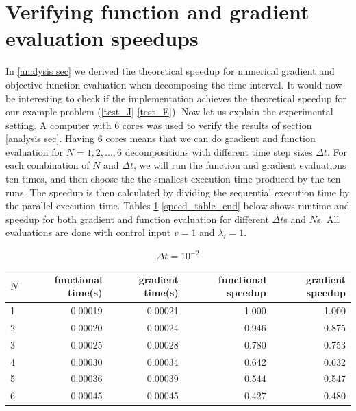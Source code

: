 \section{Verifying function and gradient evaluation speedups} \label{ver S sec}
In \ref{analysis sec} we derived the theoretical speedup for numerical gradient and objective function evaluation when decomposing the time-interval. It would now be interesting to check if the implementation achieves the theoretical speedup for our example problem (\ref{test_J}-\ref{test_E}). Now let us explain the experimental setting. A computer with 6 cores was used to verify the results of section \ref{analysis sec}. Having 6 cores means that we can do gradient and function evaluation for $N=1,2,...,6$ decompositions with different time step sizes $\Delta t$. For each combination of $N$ and $\Delta t$, we will run the function and gradient evaluations ten times, and then choose the the smallest execution time produced by the ten runs. The speedup is then calculated by dividing the sequential execution time by the parallel execution time. Tables \ref{Speed_table1}-\ref{speed_table_end} below shows runtime and speedup for both gradient and function evaluation for different $\Delta t$s and $N$s. All evaluations are done with control input $v=1$ and $\lambda_i=1$.  
\\
\begin{table}[!h]
\centering
\caption{$\Delta t=10^{-2}$}
\label{Speed_table1}
\begin{tabular}{lrrrr}
\toprule
{}$N$ &  functional time(s) &  gradient time(s) &  functional speedup &  gradient speedup \\
\midrule
1 &           0.00019 &          0.00021 &            1.000 &          1.000 \\
2 &           0.00020 &          0.00024 &            0.946 &          0.875 \\
3 &           0.00025 &          0.00028 &            0.780 &          0.753 \\
4 &           0.00030 &          0.00034 &            0.642 &          0.632 \\
5 &           0.00036 &          0.00039 &            0.544 &          0.547 \\
6 &           0.00045 &          0.00045 &            0.427 &          0.480 \\
\bottomrule
\end{tabular}
\end{table}
